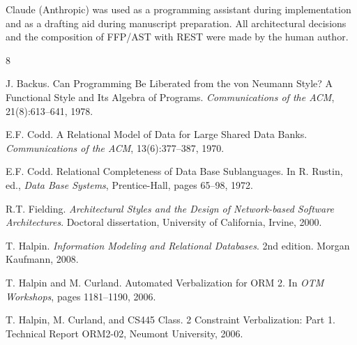 \documentclass[acmsmall,screen,review]{acmart}
\begin{document}
\begin{acks}
Claude (Anthropic) was used as a programming assistant during implementation and as a drafting aid during manuscript preparation. All architectural decisions and the composition of FFP/AST with REST were made by the human author.
\end{acks}


\begin{thebibliography}{8}

J. Backus.
\newblock Can Programming Be Liberated from the von Neumann Style? {A} Functional Style and Its Algebra of Programs.
\newblock \emph{Communications of the ACM}, 21(8):613--641, 1978.

E.F. Codd.
\newblock A Relational Model of Data for Large Shared Data Banks.
\newblock \emph{Communications of the ACM}, 13(6):377--387, 1970.

E.F. Codd.
\newblock Relational Completeness of Data Base Sublanguages.
\newblock In R. Rustin, ed., \emph{Data Base Systems}, Prentice-Hall, pages 65--98, 1972.

R.T. Fielding.
\newblock \emph{Architectural Styles and the Design of Network-based Software Architectures}.
\newblock Doctoral dissertation, University of California, Irvine, 2000.

T. Halpin.
\newblock \emph{Information Modeling and Relational Databases}.
\newblock 2nd edition. Morgan Kaufmann, 2008.

T. Halpin and M. Curland.
\newblock Automated Verbalization for {ORM} 2.
\newblock In \emph{OTM Workshops}, pages 1181--1190, 2006.

T. Halpin, M. Curland, and CS445 Class.
 2 Constraint Verbalization: {P}art 1.
\newblock Technical Report ORM2-02, Neumont University, 2006.

\end{thebibliography}
\end{document}
